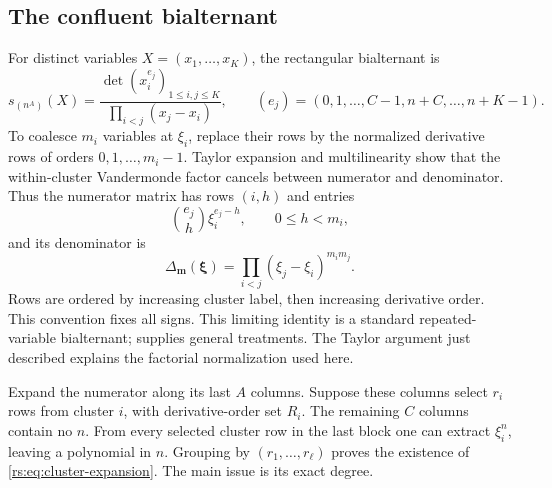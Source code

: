 \documentclass[11pt]{article}
\theoremstyle{definition}
\theoremstyle{remark}
\theoremstyle{definition}
\theoremstyle{plain}
\numberwithin{equation}{section}
\begin{document}
\subsection{The confluent bialternant}
For distinct variables $X=(x_1,\ldots,x_K)$, the rectangular bialternant is
\begin{equation}
 s_{(n^A)}(X)=
 \frac{\det(x_i^{e_j})_{1\le i,j\le K}}
      {\prod_{i<j}(x_j-x_i)},\qquad
 (e_j)=(0,1,\ldots,C-1,n+C,\ldots,n+K-1).
 \label{rs:eq:bialternant}
\end{equation}
To coalesce $m_i$ variables at $\xi_i$, replace their rows by the normalized
derivative rows of orders $0,1,\ldots,m_i-1$. Taylor expansion and multilinearity
show that the within-cluster Vandermonde factor cancels between numerator
and denominator. Thus the numerator matrix has rows $(i,h)$ and entries
\begin{equation}
 \binom{e_j}{h}\xi_i^{e_j-h},\qquad 0\le h<m_i,
 \label{rs:eq:confluent-entries}
\end{equation}
and its denominator is
\begin{equation}
 \Delta_{\boldsymbol m}(\boldsymbol\xi)
   =\prod_{i<j}(\xi_j-\xi_i)^{m_i m_j}.
 \label{rs:eq:confluent-den}
\end{equation}
Rows are ordered by increasing cluster label, then increasing derivative
order. This convention fixes all signs. This limiting identity is a standard
repeated-variable bialternant; \cite{GSM} supplies general treatments.
The Taylor argument just described explains the factorial normalization
used here.

Expand the numerator along its last $A$ columns. Suppose these columns
select $r_i$ rows from cluster $i$, with derivative-order set $R_i$.
The remaining $C$ columns contain no $n$. From every selected cluster row
in the last block one can extract $\xi_i^n$, leaving a polynomial in $n$.
Grouping by $(r_1,\ldots,r_\ell)$ proves the existence of
\eqref{rs:eq:cluster-expansion}. The main issue is its exact degree.
\end{document}
